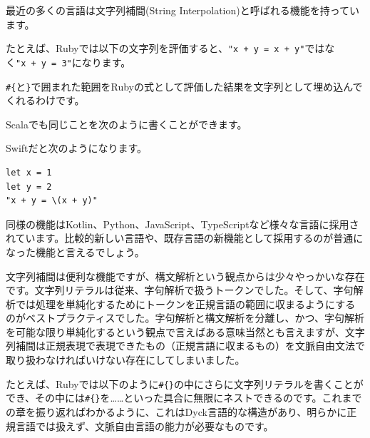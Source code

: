 最近の多くの言語は文字列補間(String
Interpolation)と呼ばれる機能を持っています。

たとえば、Rubyでは以下の文字列を評価すると、\texttt{"x\ +\ y\ =\ x\ +\ y"}ではなく\texttt{"x\ +\ y\ =\ 3"}になります。

\begin{Shaded}
\begin{Highlighting}[]
\OtherTok{\#\{}\OtherTok{\}} 
\end{Highlighting}
\end{Shaded}

\texttt{\#\{}と\texttt{\}}で囲まれた範囲をRubyの式として評価した結果を文字列として埋め込んでくれるわけです。

Scalaでも同じことを次のように書くことができます。

\begin{Shaded}
\begin{Highlighting}[]
\NormalTok{; }
 
\end{Highlighting}
\end{Shaded}

Swiftだと次のようになります。

\begin{verbatim}
let x = 1
let y = 2
"x + y = \(x + y)"
\end{verbatim}

同様の機能はKotlin、Python、JavaScript、TypeScriptなど様々な言語に採用されています。比較的新しい言語や、既存言語の新機能として採用するのが普通になった機能と言えるでしょう。

文字列補間は便利な機能ですが、構文解析という観点からは少々やっかいな存在です。文字列リテラルは従来、字句解析で扱うトークンでした。そして、字句解析では処理を単純化するためにトークンを正規言語の範囲に収まるようにするのがベストプラクティスでした。字句解析と構文解析を分離し、かつ、字句解析を可能な限り単純化するという観点で言えばある意味当然とも言えますが、文字列補間は正規表現で表現できたもの（正規言語に収まるもの）を文脈自由文法で取り扱わなければいけない存在にしてしまいました。

たとえば、Rubyでは以下のように\texttt{\#\{\}}の中にさらに文字列リテラルを書くことができ、その中には\texttt{\#\{\}}を\ldots\ldots といった具合に無限にネストできるのです。これまでの章を振り返ればわかるように、これはDyck言語的な構造があり、明らかに正規言語では扱えず、文脈自由言語の能力が必要なものです。

